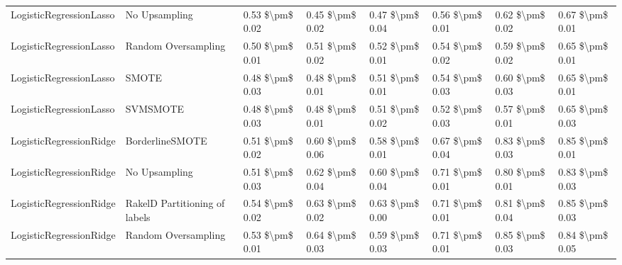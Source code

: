 \begin{tabular}{llllllll}
        LogisticRegressionLasso &                 No Upsampling &     0.53 \$\textbackslash pm\$ 0.02 &           0.45 \$\textbackslash pm\$ 0.02 &       0.47 \$\textbackslash pm\$ 0.04 &        0.56 \$\textbackslash pm\$ 0.01 &                         0.62 \$\textbackslash pm\$ 0.02 & 0.67 \$\textbackslash pm\$ 0.01 \\
        LogisticRegressionLasso &           Random Oversampling &     0.50 \$\textbackslash pm\$ 0.01 &           0.51 \$\textbackslash pm\$ 0.02 &       0.52 \$\textbackslash pm\$ 0.01 &        0.54 \$\textbackslash pm\$ 0.02 &                         0.59 \$\textbackslash pm\$ 0.02 & 0.65 \$\textbackslash pm\$ 0.01 \\
        LogisticRegressionLasso &                         SMOTE &     0.48 \$\textbackslash pm\$ 0.03 &           0.48 \$\textbackslash pm\$ 0.01 &       0.51 \$\textbackslash pm\$ 0.01 &        0.54 \$\textbackslash pm\$ 0.03 &                         0.60 \$\textbackslash pm\$ 0.03 & 0.65 \$\textbackslash pm\$ 0.01 \\
        LogisticRegressionLasso &                      SVMSMOTE &     0.48 \$\textbackslash pm\$ 0.03 &           0.48 \$\textbackslash pm\$ 0.01 &       0.51 \$\textbackslash pm\$ 0.02 &        0.52 \$\textbackslash pm\$ 0.03 &                         0.57 \$\textbackslash pm\$ 0.01 & 0.65 \$\textbackslash pm\$ 0.03 \\
        LogisticRegressionRidge &               BorderlineSMOTE &     0.51 \$\textbackslash pm\$ 0.02 &           0.60 \$\textbackslash pm\$ 0.06 &       0.58 \$\textbackslash pm\$ 0.01 &        0.67 \$\textbackslash pm\$ 0.04 &                         0.83 \$\textbackslash pm\$ 0.03 & 0.85 \$\textbackslash pm\$ 0.01 \\
        LogisticRegressionRidge &                 No Upsampling &     0.51 \$\textbackslash pm\$ 0.03 &           0.62 \$\textbackslash pm\$ 0.04 &       0.60 \$\textbackslash pm\$ 0.04 &        0.71 \$\textbackslash pm\$ 0.01 &                         0.80 \$\textbackslash pm\$ 0.01 & 0.83 \$\textbackslash pm\$ 0.03 \\
        LogisticRegressionRidge & RakelD Partitioning of labels &     0.54 \$\textbackslash pm\$ 0.02 &           0.63 \$\textbackslash pm\$ 0.02 &       0.63 \$\textbackslash pm\$ 0.00 &        0.71 \$\textbackslash pm\$ 0.01 &                         0.81 \$\textbackslash pm\$ 0.04 & 0.85 \$\textbackslash pm\$ 0.03 \\
        LogisticRegressionRidge &           Random Oversampling &     0.53 \$\textbackslash pm\$ 0.01 &           0.64 \$\textbackslash pm\$ 0.03 &       0.59 \$\textbackslash pm\$ 0.03 &        0.71 \$\textbackslash pm\$ 0.01 &                         0.85 \$\textbackslash pm\$ 0.03 & 0.84 \$\textbackslash pm\$ 0.05 \\

\end{tabular}
